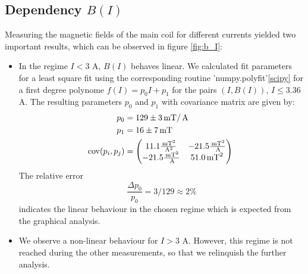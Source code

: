 \subsection{Dependency $B(I)$}
Measuring the magnetic fields of the main coil for different currents yielded two 
important results, which can be observed in figure \ref{fig:b_I}:
\begin{itemize}
    \item
        In the regime $I < 3$ A, $B(I)$ behaves linear. We calculated fit parameters 
        for a least square fit using the corresponding routine 'numpy.polyfit'\ref{scipy} for 
        a first degree polynome $f(I) = p_0 I + p_1$ for the pairs $(I, B(I))$, $I \le 3.36$ A. 
        The resulting parameters $p_0$ and $p_1$ with covariance matrix are given by:
        \begin{align}
            p_0 &= 129 \pm 3 \, \mathrm{mT} / \, \mathrm{A}\\
            p_1 &= 16 \pm 7 \, \mathrm{mT}\\
            \mathrm{cov}(p_i, p_j) &= 
            \begin{pmatrix}
                11.1\frac{\, \mathrm{mT}^2}{\, \mathrm{A}^2} &-21.5\frac{\, \mathrm{mT}^2}{\, \mathrm{A}} \\
                -21.5\frac{\, \mathrm{mT}^2}{\, \mathrm{A}} &51.0\, \mathrm{mT}^2 \\
            \end{pmatrix} 
            \, \mathrm{}
        \end{align}
        The relative error 
        \begin{equation}
            \frac{\Delta p_0}{p_0} = 3 / 129 \approx 2\%
        \end{equation}
        indicates the linear behaviour in the chosen regime which is expected from the 
        graphical analysis. 
    \item
        We observe a non-linear behaviour for $I > 3$ A. However, this regime is 
        not reached during the other measurements, so that we relinquish the further analysis. 
\end{itemize}

